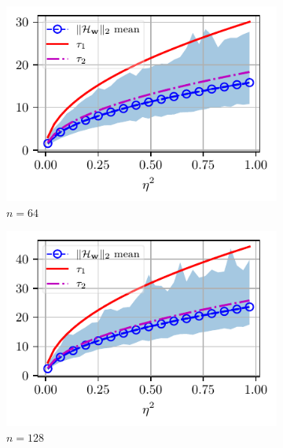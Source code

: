 	\begin{figure}[t]
		\centering
		\begin{subfigure}{0.4\linewidth}
			\centering
			\includegraphics[width = \linewidth]{Figuras/taus_N_64_beta_0.9.pdf}
			\caption{$n = 64$}
		\end{subfigure}
		\begin{subfigure}{0.4\linewidth}
			\centering
			\includegraphics[width = \linewidth]{Figuras/taus_N_128_beta_0.9.pdf}
			\caption{$n = 128$}
		\end{subfigure}
		\begin{subfigure}{0.4\linewidth}
			\centering

\end{subfigure}
\end{figure}

